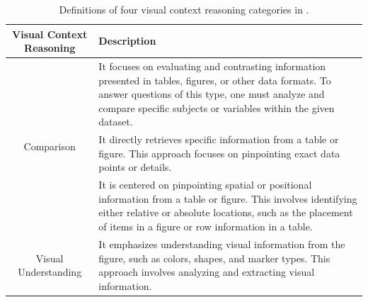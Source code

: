 \begin{table}[!t]
\centering
\small
\renewcommand\tabcolsep{1.0pt} %
\begin{tabular}{cp{11.5cm}}
    \toprule
    \textbf{Visual Context Reasoning} & \textbf{Description} \\
    \midrule
    \multirow{3}{*}{\parbox{4cm}{\centering Comparison \\ }}
    &  It focuses on evaluating and contrasting information presented in tables, figures, or other data formats. To answer questions of this type, one must analyze and compare specific subjects or variables within the given dataset. \\
    \midrule
    \multirow{2}{*}{\parbox{4cm}{\centering Data Extraction  }}
    &  It directly retrieves specific information from a table or figure. This approach focuses on pinpointing exact data points or details.\\
    \midrule
    \multirow{3}{*}{\parbox{4cm}{\centering Location  \\ }}
    &  It is centered on pinpointing spatial or positional information from a table or figure. This involves identifying either relative or absolute locations, such as the placement of items in a figure or row information in a table.\\
    \midrule
    \multirow{3}{*}{\parbox{4cm}{\centering Visual Understanding \\ }}
    & It emphasizes understanding visual information from the figure, such as colors, shapes, and marker types. This approach involves analyzing and extracting visual information.\\
    \bottomrule
\end{tabular}
\caption{Definitions of four visual context reasoning categories in \data.}
\label{tab:locality_reasoning}
\end{table}





